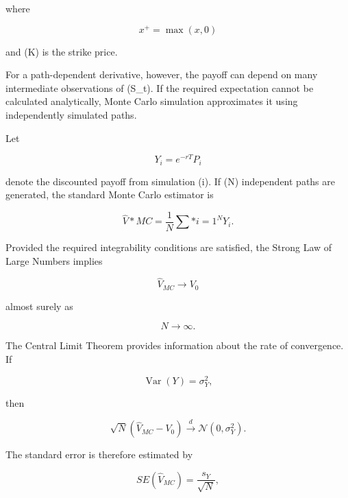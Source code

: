 \documentclass[12pt,a4paper]{report}
\begin{document}
where

\begin{equation}
x^+
=
\max(x,0)
\end{equation}

and (K) is the strike price.

For a path-dependent derivative, however, the payoff can depend on many intermediate observations of (S_t). If the required expectation cannot be calculated analytically, Monte Carlo simulation approximates it using independently simulated paths.

Let

\begin{equation}
Y_i
=
e^{-rT}P_i
\end{equation}

denote the discounted payoff from simulation (i). If (N) independent paths are generated, the standard Monte Carlo estimator is

\begin{equation}
\widehat{V}*{MC}
=
\frac{1}{N}
\sum*{i=1}^{N}
Y_i.
\end{equation}

Provided the required integrability conditions are satisfied, the Strong Law of Large Numbers implies

\begin{equation}
\widehat{V}_{MC}
\rightarrow
V_0
\end{equation}

almost surely as

\begin{equation}
N\rightarrow\infty.
\end{equation}

The Central Limit Theorem provides information about the rate of convergence. If

\begin{equation}
\operatorname{Var}(Y)
=
\sigma_Y^2,
\end{equation}

then

\begin{equation}
\sqrt{N}
\left(
\widehat{V}_{MC}-V_0
\right)
\overset{d}{\longrightarrow}
\mathcal{N}(0,\sigma_Y^2).
\end{equation}

The standard error is therefore estimated by

\begin{equation}
SE(\widehat{V}_{MC})
=
\frac{s_Y}{\sqrt{N}},
\end{equation}
\end{document}
